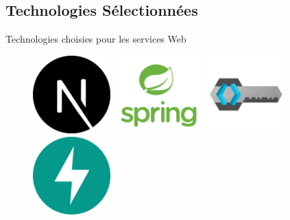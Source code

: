 \subsection{Technologies Sélectionnées}
\begin{frame}{Technologies choisies pour les services Web}
    \begin{figure}[H]
        \centering
        \begin{minipage}{0.32\textwidth}
            \centering
            \includegraphics[height=3cm]{assets/images/next.png}
        \end{minipage}%
        \hspace{0.03\textwidth}
        \begin{minipage}{0.32\textwidth}
            \centering
            \includegraphics[height=3cm]{assets/images/spring.png}
        \end{minipage}%
        \hspace{0.03\textwidth}
        \begin{minipage}{0.32\textwidth}
            \centering
            \includegraphics[height=3cm]{assets/images/keycloak.png}
        \end{minipage}%
        \hspace{0.03\textwidth}
        \begin{minipage}{0.32\textwidth}
            \centering
            \includegraphics[height=3cm]{assets/images/fastapi.png}
        \end{minipage}

    \end{figure}
\end{frame}



